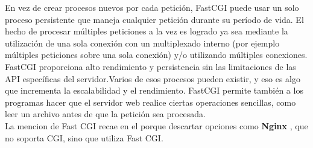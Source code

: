 \documentclass{article}
\begin{document}
En vez de crear procesos nuevos por cada petición, FastCGI puede usar un solo proceso persistente que maneja cualquier petición durante su período de vida. El hecho de procesar múltiples peticiones a la vez es logrado ya sea mediante la utilización de una sola conexión con un multiplexado interno (por ejemplo múltiples peticiones sobre una sola conexión) y/o utilizando múltiples conexiones. \\

 FastCGI proporciona alto rendimiento y persistencia sin las limitaciones de las API específicas del servidor.Varios de esos procesos pueden existir, y eso es algo que incrementa la escalabilidad y el rendimiento. FastCGI permite también a los programas hacer que el servidor web realice ciertas operaciones sencillas, como leer un archivo antes de que la petición sea procesada.\\

La mencion de Fast CGI recae en el porque descartar opciones como \textbf{Nginx} , que no soporta CGI, sino que utiliza Fast CGI. \\
\end{document}
